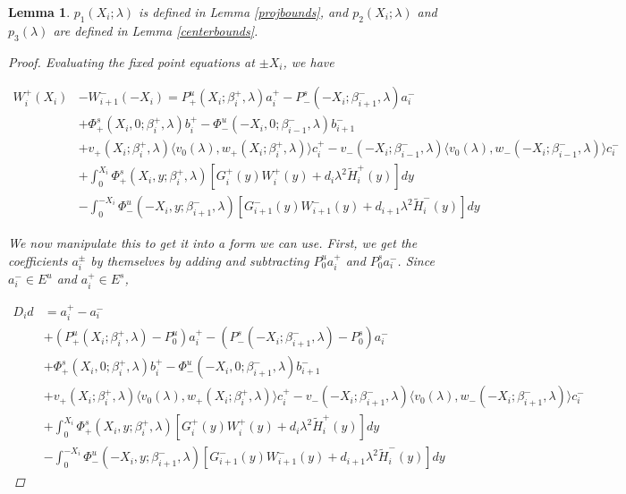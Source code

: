 \documentclass[12pt]{article}
\newtheorem{lemma}{Lemma}
\begin{document}
\begin{lemma}
$p_1(X_i; \lambda)$ is defined in Lemma \ref{projbounds}, and $p_2(X_i; \lambda)$ and $p_3(\lambda)$ are defined in Lemma \ref{centerbounds}. 

\begin{proof}

Evaluating the fixed point equations at $\pm X_i$, we have

\begin{align*}
W_i^+(X_i) &- W_{i+1}^-(-X_i) = P^u_+(X_i; \beta_i^+, \lambda) a_i^+ - P^s_-(-X_i; \beta_{i+1}^-, \lambda) a_i^- \\
&+ \Phi^s_+(X_i, 0; \beta_i^+, \lambda)b_i^+ - \Phi^u_-(-X_i, 0; \beta_{i-1}^-, \lambda)b_{i+1}^- \\
&+ v_+(X_i; \beta_i^+, \lambda) \langle v_0(\lambda), w_+(X_i; \beta_i^+, \lambda) \rangle c_i^+ - v_-(-X_i; \beta_{i-1}^-, \lambda) \langle v_0(\lambda), w_-(-X_i; \beta_{i-1}^-, \lambda) \rangle c_i^- \\
&+ \int_0^{X_i} \Phi^s_+(X_i, y; \beta_i^+, \lambda) [ G_i^+(y) W_i^+(y) + d_i \lambda^2 \tilde{H}_i^+(y) ] dy \\
&- \int_0^{-X_i} \Phi^u_-(-X_i, y; \beta_{i+1}^-, \lambda) [ G_{i+1}^-(y) W_{i+1}^-(y) + d_{i+1} \lambda^2 \tilde{H}_i^-(y) ] dy
\end{align*}

We now manipulate this to get it into a form we can use. First, we get the coefficients $a_i^\pm$ by themselves by adding and subtracting $P_0^u a_i^+$ and $P_0^s a_i^-$. Since $a_i^- \in E^u$ and $a_i^+ \in E^s$, 

\begin{align*}
D_i d &= a_i^+ - a_i^- \\
&+ (P^u_+(X_i; \beta_i^+, \lambda) - P_0^u)a_i^+ - (P^s_-(-X_i; \beta_{i+1}^-, \lambda) - P_0^s)a_i^- \\
&+ \Phi^s_+(X_i, 0; \beta_i^+, \lambda)b_i^+ - \Phi^u_-(-X_i, 0; \beta_{i+1}^-, \lambda)b_{i+1}^- \\
&+ v_+(X_i; \beta_i^+, \lambda) \langle v_0(\lambda), w_+(X_i; \beta_i^+, \lambda) \rangle c_i^+ - v_-(-X_i; \beta_{i+1}^-, \lambda) \langle v_0(\lambda), w_-(-X_i; \beta_{i+1}^-, \lambda) \rangle c_i^- \\
&+ \int_0^{X_i} \Phi^s_+(X_i, y; \beta_i^+, \lambda) [ G_i^+(y) W_i^+(y) + d_i \lambda^2 \tilde{H}_i^+(y) ] dy \\
&- \int_0^{-X_i} \Phi^u_-(-X_i, y; \beta_{i+1}^-, \lambda) [ G_{i+1}^-(y) W_{i+1}^-(y) + d_{i+1} \lambda^2 \tilde{H}_i^-(y) ] dy
\end{align*}


\end{proof}
\end{lemma}
\end{document}
